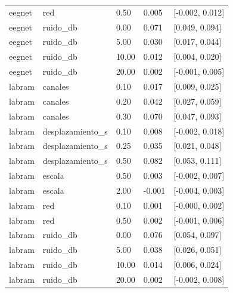 \begin{table}[htbp]
{\begin{tabular}{lllll}
eegnet & red & 0.50 & 0.005 & [-0.002, 0.012] \\
eegnet & ruido\_db & 0.00 & 0.071 & [0.049, 0.094] \\
eegnet & ruido\_db & 5.00 & 0.030 & [0.017, 0.044] \\
eegnet & ruido\_db & 10.00 & 0.012 & [0.004, 0.020] \\
eegnet & ruido\_db & 20.00 & 0.002 & [-0.001, 0.005] \\
labram & canales & 0.10 & 0.017 & [0.009, 0.025] \\
labram & canales & 0.20 & 0.042 & [0.027, 0.059] \\
labram & canales & 0.30 & 0.070 & [0.047, 0.093] \\
labram & desplazamiento\_s & 0.10 & 0.008 & [-0.002, 0.018] \\
labram & desplazamiento\_s & 0.25 & 0.035 & [0.021, 0.048] \\
labram & desplazamiento\_s & 0.50 & 0.082 & [0.053, 0.111] \\
labram & escala & 0.50 & 0.003 & [-0.002, 0.007] \\
labram & escala & 2.00 & -0.001 & [-0.004, 0.003] \\
labram & red & 0.10 & 0.001 & [-0.000, 0.002] \\
labram & red & 0.50 & 0.002 & [-0.001, 0.006] \\
labram & ruido\_db & 0.00 & 0.076 & [0.054, 0.097] \\
labram & ruido\_db & 5.00 & 0.038 & [0.026, 0.051] \\
labram & ruido\_db & 10.00 & 0.014 & [0.006, 0.024] \\
labram & ruido\_db & 20.00 & 0.002 & [-0.002, 0.008] \\
\bottomrule\end{tabular}}\end{table}
\begin{table}[htbp]\centering\small
\caption{Índices de lateralización para 10 sujetos apartados y semilla 2026.}
\end{table}
